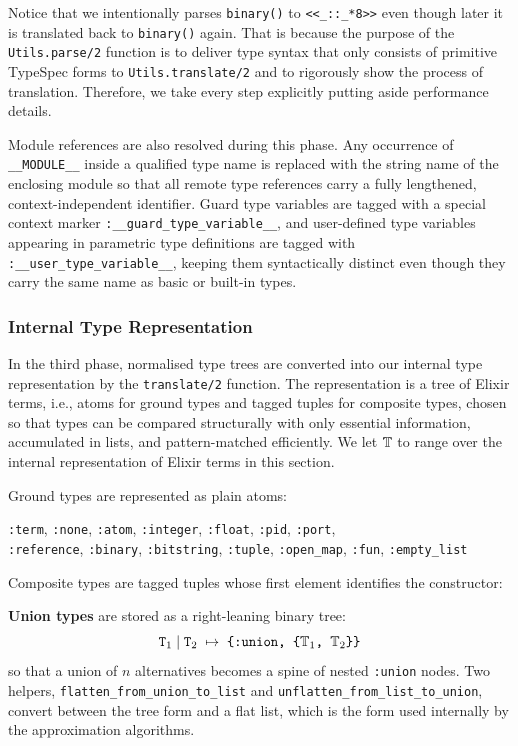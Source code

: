 Notice that we intentionally parses \texttt{binary()} to \texttt{<<\_::\_*8>>} even though later it is translated back to \texttt{binary()} again.
That is because the purpose of the \texttt{Utils.parse/2} function is to deliver type syntax that only consists of primitive TypeSpec forms to \texttt{Utils.translate/2} and to rigorously show the process of translation.
Therefore, we take every step explicitly putting aside performance details.


Module references are also resolved during this phase.
Any occurrence of \texttt{\_\_MODULE\_\_} inside a qualified type name is replaced with the string name of the enclosing module so that all remote type references carry a fully lengthened, context-independent identifier.
Guard type variables are tagged with a special context marker \texttt{:\_\_guard\_type\_variable\_\_}, and user-defined type variables appearing in parametric type definitions are tagged with \texttt{:\_\_user\_type\_variable\_\_}, keeping them syntactically distinct even though they carry the same name as basic or built-in types.

\subsubsection{Internal Type Representation}\label{sec:internal-type-repr}

In the third phase, normalised type trees are converted into our internal type representation by the \texttt{translate/2} function.
The representation is a tree of Elixir terms, i.e., atoms for ground types and tagged tuples for composite types, chosen so that types can be compared structurally with only essential information, accumulated in lists, and pattern-matched efficiently.
We let $\mathbb{T}$ to range over the internal representation of Elixir terms in this section.

Ground types are represented as plain atoms:
\begin{center}
\texttt{:term}, \texttt{:none}, \texttt{:atom}, \texttt{:integer}, \texttt{:float}, \texttt{:pid}, \texttt{:port},\\
\texttt{:reference}, \texttt{:binary}, \texttt{:bitstring}, \texttt{:tuple}, \texttt{:open\_map}, \texttt{:fun}, \texttt{:empty\_list}
\end{center}

Composite types are tagged tuples whose first element identifies the constructor:

\medskip
\noindent\textbf{Union types} are stored as a right-leaning binary tree:
\[
  \texttt{T}_1 \mid \texttt{T}_2 \;\mapsto\; \texttt{\{:union, \{\($$\mathbb{T}_1$$\), \($$\mathbb{T}_2$$\)\}\}}
\]
so that a union of $n$ alternatives becomes a spine of nested \texttt{:union} nodes.
Two helpers, \texttt{flatten\_from\_union\_to\_list} and \texttt{unflatten\_from\_list\_to\_union}, convert between the tree form and a flat list, which is the form used internally by the approximation algorithms.

